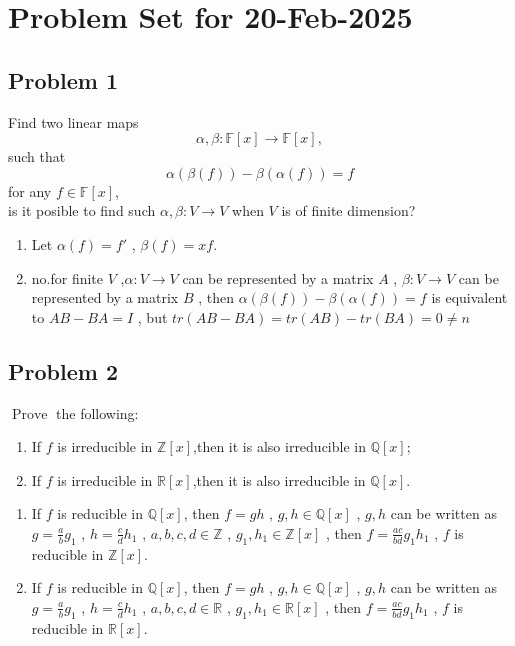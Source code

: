 \documentclass[11pt]{ctexart}
\theoremstyle{definition}
\numberwithin{equation}{section}
\newcommand{\op}[1]{\operatorname{#1}}%
\newcommand{\FF}{\mathbb{F}}%
\newcommand{\RR}{\mathbb{R}}
\newcommand{\QQ}{\mathbb{Q}}
\newcommand{\ZZ}{\mathbb{Z}}
\theoremstyle{definition}
\theoremstyle{remark}
\begin{document}
\section{Problem Set for 20-Feb-2025}
\subsection{Problem 1}
Find two linear maps\[\alpha,\beta: \FF[x]\to \FF[x],\]
such that \[\alpha(\beta(f))-\beta(\alpha(f))=f\]
for any $f \in \FF[x]$,\\
is it posible to find such $\alpha,\beta: V \to V$ when $V$ is of finite dimension?
\begin{aaa}
    \begin{enumerate}
        \item Let $\alpha(f)=f'$ , $\beta(f) = xf.$
        \item no.for finite $V$ ,$\alpha: V\to V$ can be represented by a matrix $A$ , $\beta: V\to V$ can be represented by a matrix $B$ , then $\alpha(\beta(f))-\beta(\alpha(f))=f$ is equivalent to $AB-BA=I$ , but $tr(AB-BA)=tr(AB)-tr(BA)=0\neq n$
    \end{enumerate}
\end{aaa}
\subsection{Problem 2}
$\op{Prove}$ the following:
\begin{enumerate}
    \item If $f$ is irreducible in $\ZZ[x]$,then it is also irreducible in $\QQ[x]$;\\
    \item If $f$ is irreducible in $\RR[x]$,then it is also irreducible in $\QQ[x]$.
\end{enumerate}
\begin{aaa}
    \begin{enumerate}
        \item If $f$ is reducible in $\QQ[x]$, then $f=gh$ , $g,h \in \QQ[x]$ , $g,h$ can be written as $g=\frac{a}{b}g_1$ , $h=\frac{c}{d}h_1$ , $a,b,c,d \in \ZZ$ , $g_1,h_1 \in \ZZ[x]$ , then $f=\frac{ac}{bd}g_1h_1$ , $f$ is reducible in $\ZZ[x]$.
        \item If $f$ is reducible in $\QQ[x]$, then $f=gh$ , $g,h \in \QQ[x]$ , $g,h$ can be written as $g=\frac{a}{b}g_1$ , $h=\frac{c}{d}h_1$ , $a,b,c,d \in \RR$ , $g_1,h_1 \in \RR[x]$ , then $f=\frac{ac}{bd}g_1h_1$ , $f$ is reducible in $\RR[x]$.
    \end{enumerate}
\end{aaa}
\end{document}
